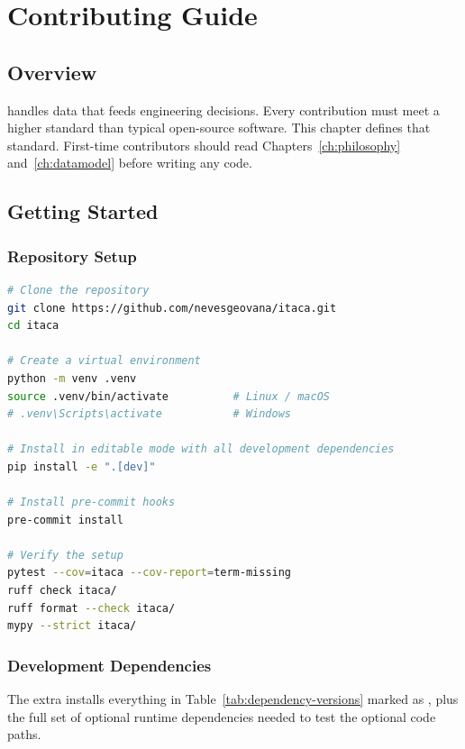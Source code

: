 
\chapter{Contributing Guide}
\label{ch:contributing}

\section{Overview}

\itc{} handles data that feeds engineering decisions. Every contribution
must meet a higher standard than typical open-source software. This
chapter defines that standard. First-time contributors should read
Chapters~\ref{ch:philosophy} and~\ref{ch:datamodel} before writing any
code.

\section{Getting Started}

\subsection{Repository Setup}

\begin{lstlisting}[language=bash]
# Clone the repository
git clone https://github.com/nevesgeovana/itaca.git
cd itaca

# Create a virtual environment
python -m venv .venv
source .venv/bin/activate          # Linux / macOS
# .venv\Scripts\activate           # Windows

# Install in editable mode with all development dependencies
pip install -e ".[dev]"

# Install pre-commit hooks
pre-commit install

# Verify the setup
pytest --cov=itaca --cov-report=term-missing
ruff check itaca/
ruff format --check itaca/
mypy --strict itaca/
\end{lstlisting}

\subsection{Development Dependencies}

The \code{[dev]} extra installs everything in
Table~\ref{tab:dependency-versions} marked as , plus the full
set of optional runtime dependencies needed to test the optional code
paths.

